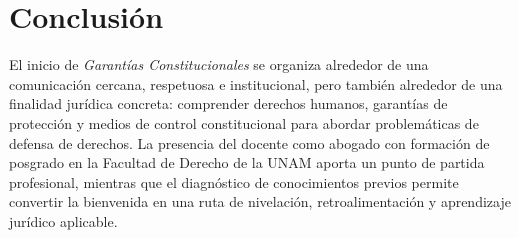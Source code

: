 \documentclass[
  spanish,
  letterpaper, oneside
]{article}
\begin{document}
\section{Conclusión}

El inicio de \textit{Garantías Constitucionales} se organiza alrededor de una comunicación cercana, respetuosa e institucional, pero también alrededor de una finalidad jurídica concreta: comprender derechos humanos, garantías de protección y medios de control constitucional para abordar problemáticas de defensa de derechos. La presencia del docente como abogado con formación de posgrado en la Facultad de Derecho de la UNAM aporta un punto de partida profesional, mientras que el diagnóstico de conocimientos previos permite convertir la bienvenida en una ruta de nivelación, retroalimentación y aprendizaje jurídico aplicable.

\clearpage
\nocite{unadmSitioWeb,unadmMallaDerecho2024,cpeum2026,leyAmparo2026}

\end{document}
